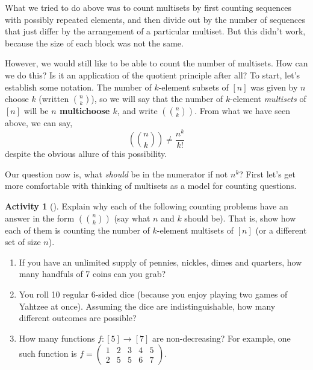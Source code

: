 \documentclass[10pt,]{book}
\newcommand{\terminology}[1]{\textbf{#1}}
\theoremstyle{plain}
\theoremstyle{definition}
\theoremstyle{definition}
\theoremstyle{definition}
\newtheorem{activity}[project]{Activity}
\numberwithin{equation}{chapter}
\newcommand{\mchoose}[2]{\left(\!\binom{#1}{#2}\!\right)}
\newcommand{\twoline}[2]{\begin{pmatrix}#1 \\ #2 \end{pmatrix}}
\newcommand{\amp}{&}
\begin{document}
\hypertarget{p-370}{}%
What we tried to do above was to count multisets by first counting sequences with possibly repeated elements, and then divide out by the number of sequences that just differ by the arrangement of a particular multiset.  But this didn't work, because the size of each block was not the same.%
\par
\hypertarget{p-371}{}%
However, we would still like to be able to count the number of multisets.  How can we do this?  Is it an application of the quotient principle after all?  To start, let's establish some notation.  The number of \(k\)-element subsets of \([n]\) was given by \(n\) choose \(k\) (written \(\binom{n}{k}\)), so we will say that the number of \(k\)-element \emph{multisets} of \([n]\) will be \terminology{\(n\) multichoose \(k\)}, and write \(\mchoose{n}{k}\).  From what we have seen above, we can say,%
\begin{equation*}
\mchoose{n}{k} \ne \frac{n^k}{k!}
\end{equation*}
despite the obvious allure of this possibility.%
\par
\hypertarget{p-372}{}%
Our question now is, what \emph{should} be in the numerator if not \(n^k\)?  First let's get more comfortable with thinking of multisets as a model for counting questions.%
\begin{activity}[]\label{activity-58}
\hypertarget{p-373}{}%
Explain why each of the following counting problems have an answer in the form \(\mchoose{n}{k}\) (say what \(n\) and \(k\) should be).  That is, show how each of them is counting the number of \(k\)-element multisets of \([n]\) (or a different set of size \(n\)).%
\begin{enumerate}[font=\bfseries,label=(\alph*),ref=\alph*]
\item\label{task-84} \hypertarget{p-374}{}%
If you have an unlimited supply of pennies, nickles, dimes and quarters, how many handfuls of 7 coins can you grab?%
\item\label{task-85} \hypertarget{p-375}{}%
You roll 10 regular 6-sided dice (because you enjoy playing two games of Yahtzee at once).  Assuming the dice are indistinguishable, how many different outcomes are possible?%
\item\label{task-86} \hypertarget{p-376}{}%
How many functions \(f:[5] \to [7]\) are non-decreasing?  For example, one such function is \(f = \twoline{1 \amp 2 \amp 3 \amp 4 \amp 5}{2 \amp 5 \amp 5 \amp 6 \amp 7}\).%
\end{enumerate}
\end{activity}
\end{document}
